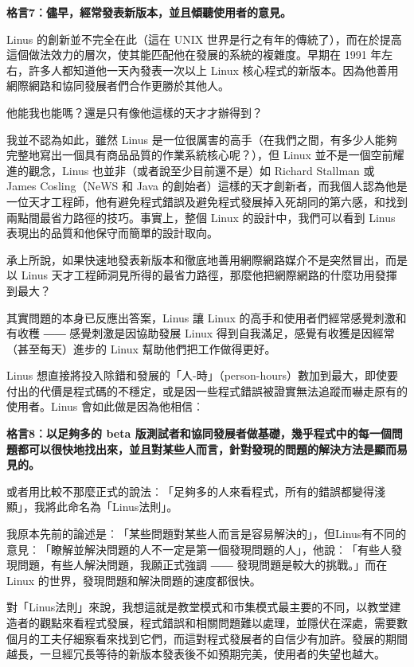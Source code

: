 \documentclass[12pt, a5paper]{book}
\begin{document}
\textbf{格言7︰儘早，經常發表新版本，並且傾聽使用者的意見。}

Linus 的創新並不完全在此（這在 UNIX
世界是行之有年的傳統了），而在於提高這個做法效力的層次，使其能匹配他在發展的系統的複雜度。早期在
1991 年左右，許多人都知道他一天內發表一次以上 Linux
核心程式的新版本。因為他善用網際網路和協同發展者們合作更勝於其他人。

他能我也能嗎？還是只有像他這樣的天才才辦得到？

我並不認為如此，雖然 Linus
是一位很厲害的高手（在我們之間，有多少人能夠完整地寫出一個具有商品品質的作業系統核心呢？），但
Linux 並不是一個空前耀進的觀念，Linus 也並非（或者說至少目前還不是）如
Richard Stallman 或 James Cosling（NeWS 和 Java
的創始者）這樣的天才創新者，而我個人認為他是一位天才工程師，他有避免程式錯誤及避免程式發展掉入死胡同的第六感，和找到兩點間最省力路徑的技巧。事實上，整個
Linux 的設計中，我們可以看到 Linus
表現出的品質和他保守而簡單的設計取向。

承上所說，如果快速地發表新版本和徹底地善用網際網路媒介不是突然冒出，而是以
Linus
天才工程師洞見所得的最省力路徑，那麼他把網際網路的什麼功用發揮到最大？

其實問題的本身已反應出答案，Linus 讓 Linux
的高手和使用者們經常感覺刺激和有收穫 ―― 感覺刺激是因協助發展 Linux
得到自我滿足，感覺有收獲是因經常（甚至每天）進步的 Linux
幫助他們把工作做得更好。

Linus
想直接將投入除錯和發展的「人-時」（person-hours）數加到最大，即使要付出的代價是程式碼的不穩定，或是因一些程式錯誤被證實無法追蹤而嚇走原有的使用者。Linus
會如此做是因為他相信︰

\textbf{格言8︰以足夠多的 beta
版測試者和協同發展者做基礎，幾乎程式中的每一個問題都可以很快地找出來，並且對某些人而言，針對發現的問題的解決方法是顯而易見的。}

或者用比較不那麼正式的說法︰「足夠多的人來看程式，所有的錯誤都變得淺顯」，我將此命名為「Linus法則」。

我原本先前的論述是︰「某些問題對某些人而言是容易解決的」，但Linus有不同的意見︰「瞭解並解決問題的人不一定是第一個發現問題的人」，他說︰「有些人發現問題，有些人解決問題，我願正式強調
―― 發現問題是較大的挑戰。」而在 Linux
的世界，發現問題和解決問題的速度都很快。

對「Linus法則」來說，我想這就是教堂模式和市集模式最主要的不同，以教堂建造者的觀點來看程式發展，程式錯誤和相關問題難以處理，並隱伏在深處，需要數個月的工夫仔細察看來找到它們，而這對程式發展者的自信少有加許。發展的期間越長，一旦經冗長等待的新版本發表後不如預期完美，使用者的失望也越大。
\end{document}

